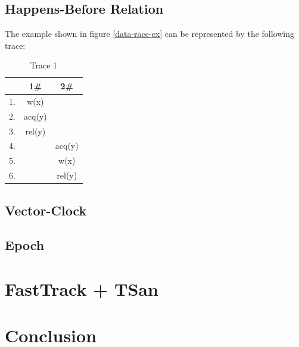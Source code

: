 \documentclass[12pt]{article}
\begin{document}
		\subsection{Happens-Before Relation}
		The example shown in figure \ref{data-race-ex} can be represented by the following trace:
		\begin{table}[h]
			\begin{center}
				\begin{tabular}{ c c c}
					& 1\# & 2\# \\
					\hline
					1. & w(x) & \\
					2. & acq(y) & \\
					3. & rel(y) & \\
					4. & & acq(y) \\
					5. & & w(x) \\
					6. & & rel(y) \\
				\end{tabular}
				\caption{Trace 1}
			\end{center}
		\end{table}
		
		\subsection{Vector-Clock}
		\subsection{Epoch}
%			
	
	\section{FastTrack + TSan}
	
	
	\section{Conclusion}
	\newpage                                          
	\printbibliography[heading= bibintoc, title={List of Literature}]
	\newpage
	\listoffigures
	\newpage
	\listoftables
\end{document}
